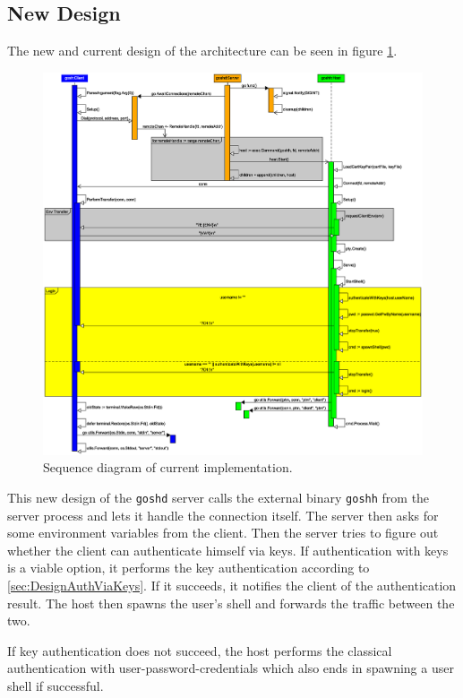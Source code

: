 \documentclass[10pt,a4paper,titlepage,twoside,english,final]{zhawreprt}
\begin{document}
\subsection{New Design}\label{ssec:NewDesign}
The new and current design of the architecture can be seen in figure \ref{fig:SeqDiaCurrent}.
\begin{figure}[ht]
\includegraphics[width=\textwidth]{SequenceDiagramNew}
\caption{Sequence diagram of current implementation.}
\label{fig:SeqDiaCurrent}
\end{figure}

This new design of the \texttt{goshd} server calls the external binary \texttt{goshh} from the server process and lets it handle the connection itself. The server then asks for some environment variables from the client. Then the server tries to figure out whether the client can authenticate himself via keys. If authentication with keys is a viable option, it performs the key authentication according to \ref{sec:DesignAuthViaKeys}. If it succeeds, it notifies the client of the authentication result. The host then spawns the user's \gls{shell} and forwards the traffic between the two.

If key authentication does not succeed, the host performs the classical authentication with user-password-credentials which also ends in spawning a user \gls{shell} if successful.
\end{document}
